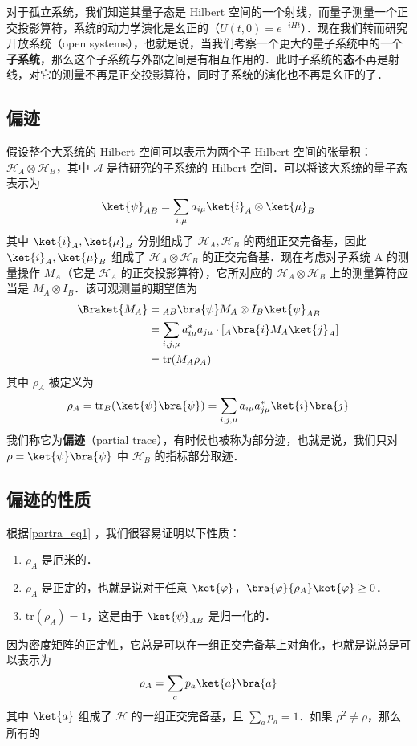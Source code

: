 

对于孤立系统，我们知道其量子态是 Hilbert 空间的一个射线，而量子测量一个正交投影算符，系统的动力学演化是幺正的（$U(t,0)=e^{-iHt}$）．现在我们转而研究开放系统（open systems），也就是说，当我们考察一个更大的量子系统中的一个\textbf{子系统}，那么这个子系统与外部之间是有相互作用的．此时子系统的\textbf{态}不再是射线，对它的测量不再是正交投影算符，同时子系统的演化也不再是幺正的了．
\subsection{偏迹}
假设整个大系统的 Hilbert 空间可以表示为两个子 Hilbert 空间的张量积：$\mathcal{H}_A\otimes \mathcal{H}_B$，其中 $\mathcal A$ 是待研究的子系统的 Hilbert 空间．可以将该大系统的量子态表示为
\begin{equation}
\ket{\psi}_{AB}=\sum_{i,\mu}a_{i\mu}\ket{i}_A\otimes \ket{\mu}_B
\end{equation}
其中 $\ket{i}_A,\ket{\mu}_B$ 分别组成了 $\mathcal{H}_A, \mathcal{H}_B$ 的两组正交完备基，因此 $\ket{i}_A,\ket{\mu}_B$ 组成了 $\mathcal{H}_A\otimes \mathcal{H}_B$ 的正交完备基．现在考虑对子系统 A 的测量操作 $M_A$（它是 $\mathcal H_A$ 的正交投影算符），它所对应的 $\mathcal{H}_A\otimes \mathcal{H}_B$ 上的测量算符应当是 $M_A\otimes I_B$．该可观测量的期望值为
\begin{equation}
\begin{aligned}
\Braket{M_A}&={}_{AB}\bra{\psi}M_A\otimes I_B \ket{\psi}_{AB}\\
&=\sum_{i,j,\mu}a_{i\mu}^*a_{j\mu} \cdot [{}_A\bra{i} M_A \ket{j}_A]\\
&=\text{tr}(M_A \rho_A)
\end{aligned}
\end{equation}
其中 $\rho_A$ 被定义为
\begin{equation}\label{partra_eq1}
\rho_A=\text{tr}_B(\ket{\psi}\bra{\psi})=\sum_{i,j,\mu}a_{i\mu}a_{j\mu}^*\ket{i}\bra{j}
\end{equation}
我们称它为\textbf{偏迹}（partial trace），有时候也被称为部分迹，也就是说，我们只对 $\rho=\ket{\psi}\bra{\psi}$ 中 $\mathcal{H}_B$ 的指标部分取迹．

\subsection{偏迹的性质}
根据\autoref{partra_eq1} ，我们很容易证明以下性质：
\begin{enumerate}
\item $\rho_A$ 是厄米的．
\item $\rho_A$ 是正定的，也就是说对于任意 $\ket{\varphi}$，$\bra{\varphi}{\rho_A}\ket{\varphi}\ge 0$．
\item $\text{tr}(\rho_A)=1$，这是由于 $\ket{\psi}_{AB}$ 是归一化的．
\end{enumerate}

因为密度矩阵的正定性，它总是可以在一组正交完备基上对角化，也就是说总是可以表示为
\begin{equation}
\rho_A=\sum_a p_a\ket{a}\bra{a}
\end{equation}
其中 $\ket{a}$ 组成了 $\mathcal{H}$ 的一组正交完备基，且 $\sum_a p_a=1$．如果 $\rho^2\neq \rho$，那么所有的